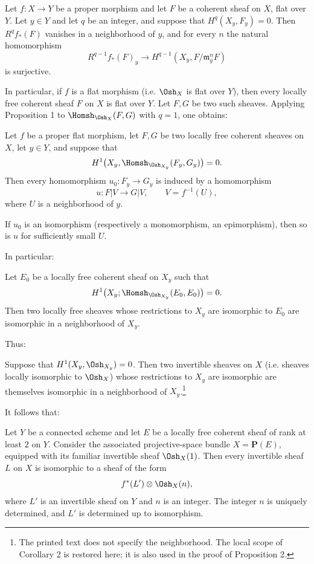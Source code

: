  Let $f:X\longrightarrow Y$ be a proper morphism and
let $F$ be a coherent sheaf on $X$, flat over $Y$. Let $y\in Y$ and let $q$
be an integer, and suppose that $H^q(X_y,F_y)=0$. Then $R^qf_*(F)$ vanishes in
a neighborhood of $y$, and for every $n$ the natural homomorphism
\[
  R^{q-1}f_*(F)_y\longrightarrow
  H^{q-1}(X_y,F/\mathfrak m_y^nF)
\]
is surjective.

In particular, if $f$ is a flat morphism (i.e. $\Osh_X$ is flat over $Y$),
then every locally free coherent sheaf $F$ on $X$ is flat over $Y$. Let $F,G$
be two such sheaves. Applying Proposition 1 to
$\Homsh_{\Osh_X}(F,G)$ with $q=1$, one obtains:

 Let $f$ be a proper flat morphism, let $F,G$ be two
locally free coherent sheaves on $X$, let $y\in Y$, and suppose that
\[
  H^1\bigl(X_y,\Homsh_{\Osh_{X_y}}(F_y,G_y)\bigr)=0.
\]
Then every homomorphism $u_0:F_y\longrightarrow G_y$ is induced by a
homomorphism
\[
  u:F|V\longrightarrow G|V,
  \qquad V=f^{-1}(U),
\]
where $U$ is a neighborhood of $y$.

 If $u_0$ is an isomorphism (respectively a monomorphism,
an epimorphism), then so is $u$ for sufficiently small $U$.

In particular:

 Let $E_0$ be a locally free coherent sheaf on $X_y$ such
that
\[
  H^1\bigl(X_y;\Homsh_{\Osh_{X_y}}(E_0,E_0)\bigr)=0.
\]
Then two locally free sheaves whose restrictions to $X_y$ are isomorphic to
$E_0$ are isomorphic in a neighborhood of $X_y$.

Thus:

 Suppose that $H^1(X_y,\Osh_{X_y})=0$. Then two
invertible sheaves on $X$ (i.e. sheaves locally isomorphic to $\Osh_X$) whose
restrictions to $X_y$ are isomorphic are themselves isomorphic in a neighborhood of $X_y$.\footnote{The printed text does not specify the neighborhood. The local scope of Corollary 2 is restored here; it is also used in the proof of Proposition 2.}

It follows that:

 Let $Y$ be a connected scheme and let $E$ be a locally free coherent sheaf of rank at least $2$ on $Y$. Consider the associated projective-space bundle
$X=\mathbf P(E)$, equipped with its familiar invertible sheaf $\Osh_X(1)$.
Then every invertible sheaf $L$ on $X$ is isomorphic to a sheaf of the form
\[
  f^*(L')\otimes\Osh_X(n),
\]
where $L'$ is an invertible sheaf on $Y$ and $n$ is an integer. The integer
$n$ is uniquely determined, and $L'$ is determined up to isomorphism.

